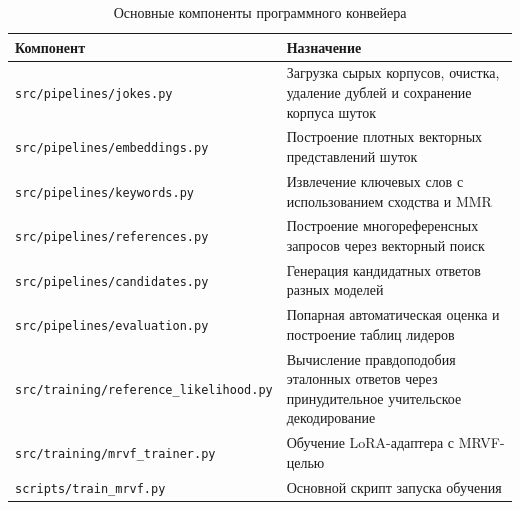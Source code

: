 \begin{table}[h]
    \centering
    \caption{Основные компоненты программного конвейера}
    \label{tab:appendix-code-structure}
    \begingroup
    \setlength{\tabcolsep}{4pt}
    \renewcommand{\arraystretch}{1.15}
    \begin{tabularx}{\textwidth}{>{\raggedright\arraybackslash}p{7.2cm}X}
        \hline
        Компонент                                      & Назначение                                                                                 \\
        \hline
        \texttt{src/pipelines/}\newline\texttt{jokes.py}                & Загрузка сырых корпусов, очистка, удаление дублей и сохранение корпуса шуток               \\
        \texttt{src/pipelines/}\newline\texttt{embeddings.py}           & Построение плотных векторных представлений шуток                                           \\
        \texttt{src/pipelines/}\newline\texttt{keywords.py}             & Извлечение ключевых слов с использованием сходства и MMR                                   \\
        \texttt{src/pipelines/}\newline\texttt{references.py}           & Построение многореференсных запросов через векторный поиск                                 \\
        \texttt{src/pipelines/}\newline\texttt{candidates.py}           & Генерация кандидатных ответов разных моделей                                               \\
        \texttt{src/pipelines/}\newline\texttt{evaluation.py}           & Попарная автоматическая оценка и построение таблиц лидеров                                 \\
        \texttt{src/training/}\newline\texttt{reference\_likelihood.py} & Вычисление правдоподобия эталонных ответов через принудительное учительское декодирование  \\
        \texttt{src/training/}\newline\texttt{mrvf\_trainer.py}         & Обучение LoRA-адаптера с MRVF-целью                                                        \\
        \texttt{scripts/}\newline\texttt{train\_mrvf.py}                & Основной скрипт запуска обучения                                                           \\
        \hline
    \end{tabularx}
    \endgroup
\end{table}

